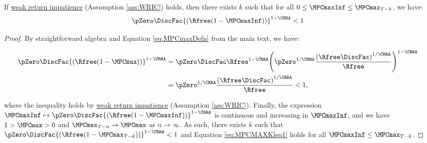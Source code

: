 \documentclass[\econtexRoot/BufferStockTheory]{subfiles}
\begin{document}
\begin{claim}\label{claim:MPCMAXKleq1}
If \hyperlink{WRIC}{weak return impatience} (Assumption \ref{ass:WRIC}) holds, then there exists $k$ such that for all $0\leq\MPCmaxInf\leq \MPCmax_{T-k}$, we have:
%
\begin{equation}\label{eq:MPCMAXKleq1}
  \pZero \DiscFac {(\Rfree (1-\MPCmaxInf))}^{1-\CRRA}   < 1
\end{equation}
%
\end{claim}
\begin{proof}

By straightforward algebra and Equation \eqref{eq:MPCmaxDefn} from the main text, we have:

\begin{equation}\begin{gathered}\begin{aligned}
\pZero \DiscFac {(\Rfree (1-\MPCmax))}^{1-\CRRA}  & = \pZero\DiscFac\Rfree^{1-\CRRA}{\left(\pZero^{1/\CRRA}\frac{{(\Rfree\DiscFac)}^{1/\CRRA}}{\Rfree}\right)}^{1-\CRRA} \\\notag
& = \pZero^{1/\CRRA}\frac{{(\Rfree\DiscFac)}^{1/\CRRA}}{\Rfree} <1 \notag,
\end{aligned}\end{gathered}\end{equation}

where the inequality holds by \hyperlink{WRIC}{weak return impatience} (Assumption \ref{ass:WRIC}).
Finally, the expression $\MPCmaxInf\mapsto \pZero \DiscFac {(\Rfree (1-\MPCmaxInf))}^{1-\CRRA} $ is continuous and increasing in $\MPCmaxInf$, and we have $1>\MPCmax>0$ and $\MPCmax_{T-n} \rightarrow \MPCmax$ as $n\rightarrow\infty$.
As such, there exists $k$ such that $\pZero \DiscFac {(\Rfree (1-\MPCmax_{T-k}))}^{1-\CRRA}<1$ and Equation \eqref{eq:MPCMAXKleq1} holds for all $\MPCmaxInf\leq \MPCmax_{T-k}$.


\end{proof}
\end{document}
